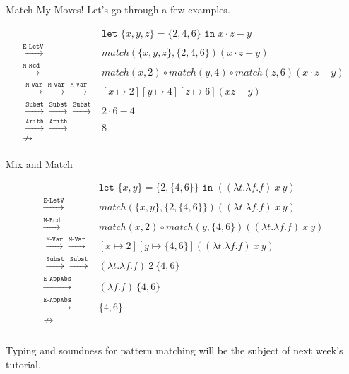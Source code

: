 \documentclass[11pt]{beamer}
\begin{document}
\begin{frame}[fragile=singleslide]{Match My Moves!}
Let's go through a few examples.

\begin{align*}
& \texttt{let } \{x,y,z\} = \{2,4,6\} \texttt{ in } x \cdot z - y \\
\xrightarrow{\texttt{E-LetV}} & match(\{x,y,z\}, \{2,4,6\})(x \cdot z - y) \\
\xrightarrow{\texttt{M-Rcd}} & match(x,2)\circ match(y,4)\circ match(z, 6)(x \cdot z-y) \\
\xrightarrow{\texttt{M-Var}} \xrightarrow{\texttt{M-Var}} \xrightarrow{\texttt{M-Var}} & [x \mapsto 2][y \mapsto 4][z \mapsto 6](xz-y) \\
\xrightarrow{\texttt{Subst}} \xrightarrow{\texttt{Subst}} \xrightarrow{\texttt{Subst}} & 2 \cdot 6 - 4 \\
\xrightarrow{\texttt{Arith}} \xrightarrow{\texttt{Arith}}  & 8 \\
\nrightarrow &  \\
\end{align*}
\end{frame}


\begin{frame}[fragile=singleslide]{Mix and Match}

\begin{align*}
& \texttt{let } \{x,y\} = \{2,\{4,6\}\} \texttt{ in } ((\lambda t. \lambda f. f)\:x\:y) \\
\xrightarrow{\texttt{E-LetV}} & match(\{x,y\}, \{2,\{4,6\}\})((\lambda t. \lambda f. f)\:x\:y) \\
\xrightarrow{\texttt{M-Rcd}}& match(x, 2) \circ match(y,\{4,6\})((\lambda t. \lambda f. f)\:x\:y) \\
\xrightarrow{\texttt{M-Var}} \xrightarrow{\texttt{M-Var}} & [x \mapsto 2][y \mapsto \{4,6\}]((\lambda t. \lambda f. f)\:x\:y) \\
\xrightarrow{\texttt{Subst}} \xrightarrow{\texttt{Subst}} & (\lambda t. \lambda f. f)\:2\:\{4,6\} \\
\xrightarrow{\texttt{E-AppAbs}}  & (\lambda f. f)\:\{4,6\} \\
\xrightarrow{\texttt{E-AppAbs}}  & \{4,6\} \\
\nrightarrow &  \\
\end{align*} \\
\vspace{-2em}
Typing and soundness for pattern matching will be the subject of next week's tutorial.  
\end{frame}
\end{document}
